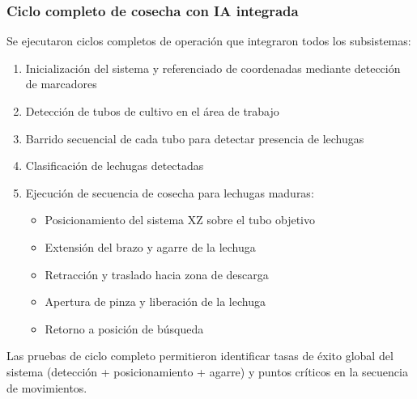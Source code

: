 \subsubsection{Ciclo completo de cosecha con IA integrada}

Se ejecutaron ciclos completos de operación que integraron todos los subsistemas:

\begin{enumerate}
    \item Inicialización del sistema y referenciado de coordenadas mediante detección de marcadores
    \item Detección de tubos de cultivo en el área de trabajo
    \item Barrido secuencial de cada tubo para detectar presencia de lechugas
    \item Clasificación de lechugas detectadas
    \item Ejecución de secuencia de cosecha para lechugas maduras:
    \begin{itemize}
        \item Posicionamiento del sistema XZ sobre el tubo objetivo
        \item Extensión del brazo y agarre de la lechuga
        \item Retracción y traslado hacia zona de descarga
        \item Apertura de pinza y liberación de la lechuga
        \item Retorno a posición de búsqueda
    \end{itemize}
\end{enumerate}

Las pruebas de ciclo completo permitieron identificar tasas de éxito global del sistema (detección + posicionamiento + agarre) y puntos críticos en la secuencia de movimientos. 
